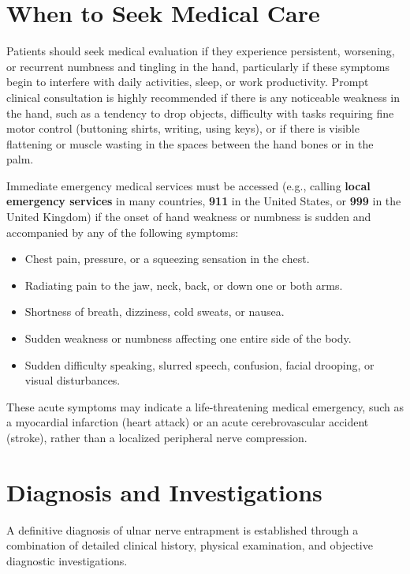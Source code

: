 \section*{When to Seek Medical Care}
Patients should seek medical evaluation if they experience persistent, worsening, or recurrent numbness and tingling in the hand, particularly if these symptoms begin to interfere with daily activities, sleep, or work productivity. Prompt clinical consultation is highly recommended if there is any noticeable weakness in the hand, such as a tendency to drop objects, difficulty with tasks requiring fine motor control (buttoning shirts, writing, using keys), or if there is visible flattening or muscle wasting in the spaces between the hand bones or in the palm.

Immediate emergency medical services must be accessed (e.g., calling \textbf{local emergency services} in many countries, \textbf{911} in the United States, or \textbf{999} in the United Kingdom) if the onset of hand weakness or numbness is sudden and accompanied by any of the following symptoms:
\begin{itemize}
\item Chest pain, pressure, or a squeezing sensation in the chest.
\item Radiating pain to the jaw, neck, back, or down one or both arms.
\item Shortness of breath, dizziness, cold sweats, or nausea.
\item Sudden weakness or numbness affecting one entire side of the body.
\item Sudden difficulty speaking, slurred speech, confusion, facial drooping, or visual disturbances.
\end{itemize}
These acute symptoms may indicate a life-threatening medical emergency, such as a myocardial infarction (heart attack) or an acute cerebrovascular accident (stroke), rather than a localized peripheral nerve compression.

\section*{Diagnosis and Investigations}
A definitive diagnosis of ulnar nerve entrapment is established through a combination of detailed clinical history, physical examination, and objective diagnostic investigations.

